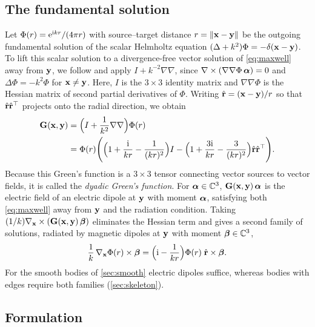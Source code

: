 \subsection{The fundamental solution}

Let $\Phi(r) = \mathrm{e}^{\mathrm{i} kr}/(4\pi r)$ with source--target distance $r = \|\mathbf{x}-\mathbf{y}\|$ be the outgoing fundamental solution of the scalar Helmholtz equation $(\Delta + k^2)\Phi = -\delta(\mathbf{x}-\mathbf{y})$. To lift this scalar solution to a divergence-free vector solution of \eqref{eq:maxwell} away from $\mathbf{y}$, we follow \cite{osipov2017} and apply $I + k^{-2}\nabla\nabla$, since $\nabla\times(\nabla\nabla\Phi\,\boldsymbol{\alpha}) = 0$ and $\Delta\Phi = -k^2\Phi$ for $\mathbf{x}\ne\mathbf{y}$. Here, $I$ is the $3\times3$ identity matrix and $\nabla\nabla\Phi$ is the Hessian matrix of second partial derivatives of $\Phi$. Writing $\hat{\mathbf{r}} = (\mathbf{x}-\mathbf{y})/r$ so that $\hat{\mathbf{r}}\hat{\mathbf{r}}^{\top}$ projects onto the radial direction, we obtain
\begin{equation}
\begin{split}
  \mathbf{G}(\mathbf{x},\mathbf{y}) &= \Bigl(I + \frac{1}{k^2}\nabla\nabla\Bigr)\Phi(r)\\
  &= \Phi(r)\Biggl(\Bigl(1+\frac{\mathrm{i}}{kr}-\frac{1}{(kr)^2}\Bigr)I-\Bigl(1+\frac{3\mathrm{i}}{kr}-\frac{3}{(kr)^2}\Bigr)\hat{\mathbf{r}}\hat{\mathbf{r}}^{\top}\Biggr).
\end{split}
  \label{eq:dyadic}
\end{equation}
Because this Green's function is a $3\times3$ tensor connecting vector sources to vector fields, it is called the \emph{dyadic Green's function}. For $\boldsymbol{\alpha}\in\mathbb{C}^3$, $\mathbf{G}(\mathbf{x},\mathbf{y})\,\boldsymbol{\alpha}$ is the electric field of an electric dipole at $\mathbf{y}$ with moment $\boldsymbol{\alpha}$, satisfying both \eqref{eq:maxwell} away from $\mathbf{y}$ and the radiation condition. Taking $(1/k)\nabla_{\mathbf{x}}\times(\mathbf{G}(\mathbf{x},\mathbf{y})\,\boldsymbol{\beta})$ eliminates the Hessian term and gives a second family of solutions, radiated by magnetic dipoles at $\mathbf{y}$ with moment $\boldsymbol{\beta}\in\mathbb{C}^3$,
\begin{equation}
  \frac{1}{k}\,\nabla_{\mathbf{x}}\Phi(r)\times\boldsymbol{\beta}
  = \Bigl(\mathrm{i}-\frac{1}{kr}\Bigr)\Phi(r)\;\hat{\mathbf{r}}\times\boldsymbol{\beta} .
  \label{eq:magnetic}
\end{equation}
For the smooth bodies of \autoref{sec:smooth} electric dipoles suffice, whereas bodies with edges require both families (\autoref{sec:skeleton}).

\subsection{Formulation}

